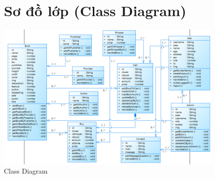 \documentclass{report}
\begin{document}
\begin{center}
    \begin{figure}[htp]
        \section{Sơ đồ lớp (Class Diagram)}
        \begin{center}
            \includegraphics[scale = 0.7]{image/classdiagram.png}
        \end{center}
        \caption{Class Diagram}
    \end{figure}
\end{center}
\end{document}
